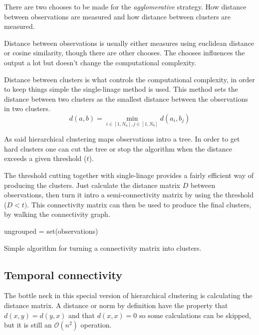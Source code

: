 There are two chooses to be made for the \textit{agglomerative} strategy.  How distance between observations are measured and how distance between clusters are measured.

Distance between observations is usually either measures using euclidean distance or cosine similarity, though there are other chooses. The chooses influences the output a lot but doesn't change the computational complexity.

Distance between clusters is what controls the computational complexity, in order to keep things simple the single-linage method is used. This method sets the distance between two clusters as the smallest distance between the observations in two clusters.
\begin{equation}
d(a, b) = \min_{i \in [1, N_a], j \in [1, N_b]} d(a_i, b_j)
\end{equation}

As said hierarchical clustering maps observations intro a tree. In order to get hard clusters one can cut the tree or stop the algorithm when the distance exceeds a given threshold ($t$).

The threshold cutting together with single-linage provides a fairly efficient way of producing the clusters. Just calculate the distance matrix $D$ between observations, then turn it intro a semi-connectivity matrix by using the threshold ($D < t)$. This connectivity matrix can then be used to produce the final clusters, by walking the connectivity graph.

\begin{algorithm}[h]
 \DontPrintSemicolon
 ungrouped = set(observations)\;
 \caption{Simple algorithm for turning a connectivity matrix into clusters.}
\end{algorithm}

\subsection{Temporal connectivity}

The bottle neck in this special version of hierarchical clustering is calculating the distance matrix. A distance or norm by definition have the property that $d(x,y) = d(y,x)$ and that $d(x,x) = 0$ so some calculations can be skipped, but it is still an $\mathcal{O}(n^2)$ operation.

